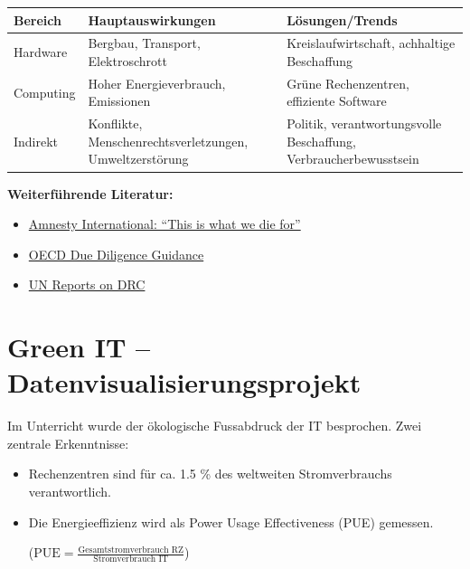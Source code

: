 \documentclass[
  nswissgerman,
  a4paper,
  DIV=11,
  numbers=noendperiod,
  ngerman]{scrreprt}
\newcounter{none} %
\providecommand{\tightlist}{%
  \setlength{\itemsep}{0pt}\setlength{\parskip}{0pt}}
\begin{document}
{\def\LTcaptype{none} %
\begin{longtable}[]{@{}
  >{\raggedright\arraybackslash}p{}
  >{\raggedright\arraybackslash}p{}
  >{\raggedright\arraybackslash}p{}@{}}
\toprule\noalign{}
\begin{minipage}[b]{\linewidth}\raggedright
Bereich
\end{minipage} & \begin{minipage}[b]{\linewidth}\raggedright
Hauptauswirkungen
\end{minipage} & \begin{minipage}[b]{\linewidth}\raggedright
Lösungen/Trends
\end{minipage} \\
\midrule\noalign{}
\endhead
\bottomrule\noalign{}
\endlastfoot
Hardware & Bergbau, Transport, Elektroschrott & Kreislaufwirtschaft,
achhaltige Beschaffung \\
Computing & Hoher Energieverbrauch, Emissionen & Grüne Rechenzentren,
effiziente Software \\
Indirekt & Konflikte, Menschenrechtsverletzungen, Umweltzerstörung &
Politik, verantwortungsvolle Beschaffung, Verbraucherbewusstsein \\
\end{longtable}
}

\textbf{Weiterführende Literatur:}

\begin{itemize}
\tightlist
\item
  \href{https://www.amnesty.org/en/documents/afr62/3183/2016/en/}{Amnesty
  International: ``This is what we die for''}
\item
  \href{https://www.oecd.org/corporate/mne/mining.htm}{OECD Due
  Diligence Guidance}
\item
  \href{https://press.un.org/en/2025/sc15982.doc.htm}{UN Reports on DRC}
\end{itemize}

\chapter{Green IT --
Datenvisualisierungsprojekt}\label{green-it-datenvisualisierungsprojekt}

Im Unterricht wurde der ökologische Fussabdruck der IT besprochen. Zwei
zentrale Erkenntnisse:

\begin{itemize}
\item
  Rechenzentren sind für ca. 1.5 \% des weltweiten Stromverbrauchs
  verantwortlich.
\item
  Die Energieeffizienz wird als Power Usage Effectiveness (PUE)
  gemessen.

  (\(\text{PUE}=\frac{\text{Gesamtstromverbrauch RZ}}{\text{Stromverbrauch IT}}\))
\end{itemize}
\end{document}
